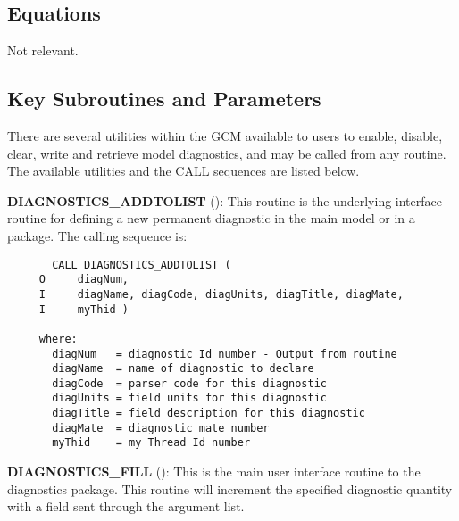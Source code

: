 \subsection{Equations}
Not relevant.

\subsection{Key Subroutines and Parameters}
\label{sec:diagnostics:diagover}

\noindent
There are several utilities within the GCM available to users to
enable, disable, clear, write and retrieve model diagnostics, and may
be called from any routine.  The available utilities and the CALL
sequences are listed below.

\noindent 
{\bf DIAGNOSTICS\_ADDTOLIST} 
():
This routine is the underlying interface routine for defining a new permanent 
diagnostic in the main model or in a package. The calling sequence is:

\begin{verbatim}
       CALL DIAGNOSTICS_ADDTOLIST (
     O     diagNum,
     I     diagName, diagCode, diagUnits, diagTitle, diagMate,
     I     myThid )

     where:
       diagNum   = diagnostic Id number - Output from routine
       diagName  = name of diagnostic to declare
       diagCode  = parser code for this diagnostic
       diagUnits = field units for this diagnostic
       diagTitle = field description for this diagnostic
       diagMate  = diagnostic mate number
       myThid    = my Thread Id number

\end{verbatim}


\noindent
{\bf DIAGNOSTICS\_FILL} 
():
This is the main user interface routine to the diagnostics package. 
This routine will increment the specified
diagnostic quantity with a field sent through the argument list.


